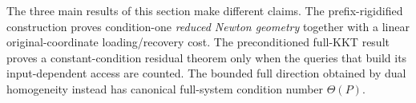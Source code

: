 The three main results of this section make different claims.
The prefix-rigidified construction proves condition-one \emph{reduced Newton
geometry} together with a linear original-coordinate loading/recovery cost.
The preconditioned full-KKT result proves a constant-condition residual theorem
only when the queries that build its input-dependent access are counted.  The
bounded full direction obtained by dual homogeneity instead has canonical
full-system condition number \(\Theta(P)\).
